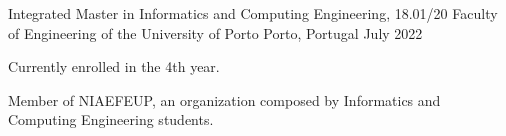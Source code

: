 
\begin{cventries}
  \cventry
    {Integrated Master in Informatics and Computing Engineering, 18.01/20} %
    {Faculty of Engineering of the University of Porto} %
    {Porto, Portugal} %
    {July 2022} %
    {
      \begin{cvitems}
        \item {Currently enrolled in the 4th year.}
        \item {Member of NIAEFEUP, an organization composed by Informatics and Computing Engineering students.}
      \end{cvitems}
    }
\end{cventries}
